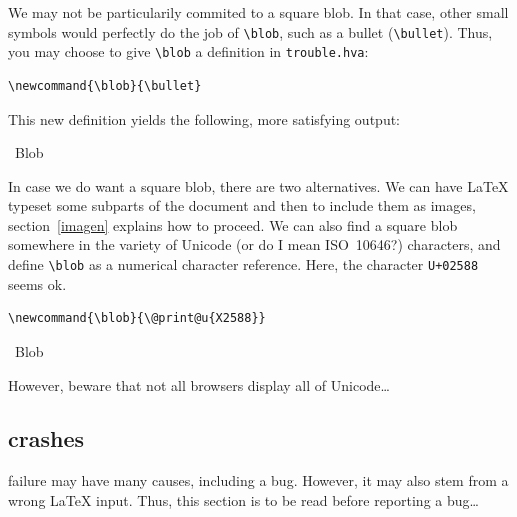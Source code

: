We may not be particularily commited to a square blob.
In that case, other small symbols would perfectly do the job
of \verb+\blob+, such as a bullet (\verb+\bullet+).
Thus, you may choose to give \verb+\blob+ a definition in
\verb+trouble.hva+:
\begin{verbatim}
\newcommand{\blob}{\bullet}
\end{verbatim}
This new definition yields the following, more satisfying output:
\begin{htmlout}\newcommand{\blob}{\bullet}%
\begin{htmlonly}%
\blob\ Blob \blob
\end{htmlonly}
\begin{latexonly}\vspace*{.5ex}
%
\end{latexonly}%
\end{htmlout}

\label{square:blob}
%
In case we do want a square blob, there are two alternatives.
We can have \LaTeX{} typeset some subparts of
the document and then to include them as images, section~\ref{imagen}
explains how to proceed.
We can also find a square blob somewhere in the variety of Unicode
(or do I mean ISO~10646?) characters,
and define \verb+\blob+ as a numerical
character reference. Here, the character \texttt{U+02588}
seems ok.
\begin{verbatim}
\newcommand{\blob}{\@print@u{X2588}}
\end{verbatim}
\begin{htmlout}%
\begin{htmlonly}\newcommand{\blob}{}%
\blob\ Blob \blob
\end{htmlonly}
\begin{latexonly}\vspace*{.5ex}
%
\end{latexonly}%
\end{htmlout}
However, beware that not all browsers display all of Unicode\ldots


\subsection{\hevea{} crashes}

\hevea{} failure may have many causes, including a bug.
However, it may also stem from a wrong \LaTeX{} input.
Thus, this section is to be read before reporting a bug\ldots

